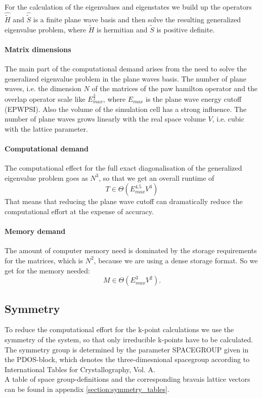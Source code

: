 \documentclass[final,12pt]{article}
\begin{document}
{{{{{{For the calculation of the eigenvalues and eigenstates we build up the
operators $\hat{\tilde H}$ and $\hat{\tilde S}$ is a finite plane wave
basis and then solve the resulting generalized eigenvalue problem,
where $\tilde H$ is hermitian and $\tilde S$ is positive definite.

\paragraph{Matrix dimensions}
The main part of the computational demand arises from the need to solve the
generalized eigenvalue problem in the plane waves basis. The number of plane
waves, i.e. the dimension $N$ of the matrices of the paw hamilton operator and the
overlap operator scale like $E_{max}^{\frac{3}{2}}$, where $E_{max}$ is the
plane wave energy cutoff (EPWPSI). Also the volume of the simulation cell has a
strong influence. The number of plane waves grows linearly with the real space
volume $V$, i.e. cubic with the lattice parameter.
\paragraph{Computational demand}
The computational effect for the full exact diagonalisation of the generalized
eigenvalue problem goes as $N^3$, so that we get an overall runtime of
\begin{equation}
T \in \Theta(E_{max}^{4.5}V^3)
\end{equation}
That means that reducing the plane wave cutoff can dramatically reduce the
computational effort at the expense of accuracy.

\paragraph{Memory demand}
The amount of computer memory need is dominated by the storage requirements for
the matrices, which is $N^2$, because we are using a dense storage format.  So
we get for the memory needed:
\begin{equation}
  M\in \Theta(E_{max}^{3}V^2).
\end{equation}

\subsection{Symmetry}
To reduce the computational effort for the k-point calculations we use the
symmetry of the system, so that only irreducible k-points have to be calculated.
The symmetry group is determined by the parameter SPACEGROUP given in the
PDOS-block, which denotes the three-dimesnional spacegroup according to
International Tables for Crystallography, Vol. A. \\
A table of space group-definitions and the corresponding bravais lattice vectors
can be found in appendix \ref{section:symmetry_tables}.



}}}}}}
\end{document}
